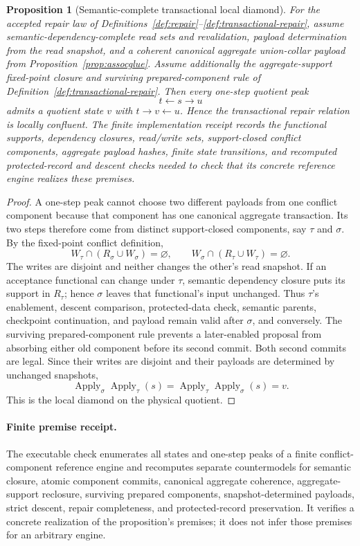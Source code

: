 \documentclass[11pt]{article}
\newtheorem{proposition}[theorem]{Proposition}
\theoremstyle{remark}
\theoremstyle{plain}
\begin{document}
\begin{proposition}[Semantic-complete transactional local diamond]\label{prop:local-confluence}
For the accepted repair law of
Definitions~\ref{def:repair}--\ref{def:transactional-repair}, assume semantic-dependency-complete
read sets and revalidation, payload determination from the read snapshot, and a coherent canonical
aggregate union-collar payload from Proposition~\ref{prop:assocglue}.  Assume additionally the
aggregate-support fixed-point closure and surviving prepared-component rule of
Definition~\ref{def:transactional-repair}.  Then every one-step quotient peak
\[
t\longleftarrow s\longrightarrow u
\]
admits a quotient state \(v\) with \(t\to v\leftarrow u\). Hence the transactional repair
relation is locally confluent.  The finite implementation receipt
records the functional supports, dependency closures,
read/write sets, support-closed conflict components, aggregate payload hashes, finite state
transitions, and recomputed protected-record and descent checks needed to check that its concrete
reference engine realizes these premises.
\end{proposition}

\begin{proof}
A one-step peak cannot choose two different payloads from one conflict component because that
component has one canonical aggregate transaction.  Its two steps therefore come from distinct
support-closed components, say \(\tau\) and \(\sigma\).  By the fixed-point conflict definition,
\[
W_\tau\cap(R_\sigma\cup W_\sigma)=\varnothing,
\qquad
W_\sigma\cap(R_\tau\cup W_\tau)=\varnothing.
\]
The writes are disjoint and neither changes the other's read snapshot.  If an acceptance
functional can change under \(\tau\), semantic dependency closure puts its support in
\(R_\tau\); hence \(\sigma\) leaves that functional's input unchanged.  Thus \(\tau\)'s
enablement, descent comparison, protected-data check, semantic parents, checkpoint continuation,
and payload remain valid after \(\sigma\), and conversely.  The surviving prepared-component
rule prevents a later-enabled proposal from absorbing either old component before its second
commit.  Both second commits are legal.  Since
their writes are disjoint and their payloads are determined by unchanged snapshots,
\[
\operatorname{Apply}_\sigma\operatorname{Apply}_\tau(s)
=\operatorname{Apply}_\tau\operatorname{Apply}_\sigma(s)=v.
\]
This is the local diamond on the physical quotient.
\end{proof}

\paragraph{Finite premise receipt.}
The executable check enumerates all states and one-step peaks of a finite conflict-component
reference engine and recomputes separate countermodels for semantic closure,
atomic component commits, canonical aggregate coherence, aggregate-support reclosure,
surviving prepared components, snapshot-determined payloads, strict descent, repair
completeness, and protected-record preservation.  It verifies a
concrete realization of the proposition's premises; it does not infer those
premises for an arbitrary engine.
\end{document}

